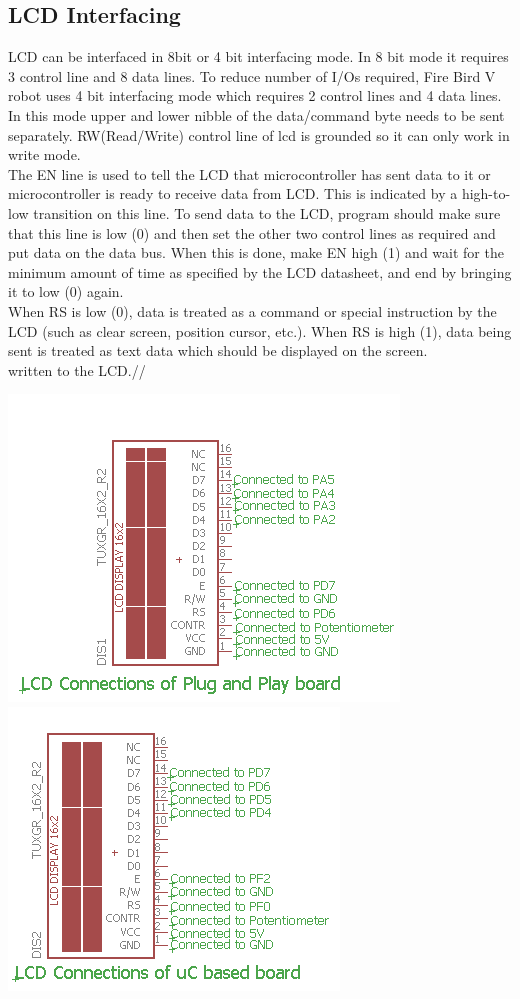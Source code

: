\documentclass[a4paper,10pt,oneside]{article}
\begin{document}
{	\subsection{\huge \textbf{LCD Interfacing}}{
	LCD can be interfaced in 8bit or 4 bit interfacing mode. In 8 bit mode it requires 3 control line
	and 8 data lines. To reduce number of I/Os required, Fire Bird V robot uses 4 bit interfacing
	mode which requires 2 control lines and 4 data lines. In this mode upper and lower nibble of the
	data/command byte needs to be sent separately. RW(Read/Write) control line of lcd is grounded so it can only work in write mode.\\
	The EN line is used to tell the LCD that microcontroller
	has sent data to it or microcontroller is ready to receive data from LCD. This is indicated by a
	high-to-low transition on this line. To send data to the LCD, program should make sure that this
	line is low (0) and then set the other two control lines as required and put data on the data bus.
	When this is done, make EN high (1) and wait for the minimum amount of time as specified by
	the LCD datasheet, and end by bringing it to low (0) again.\\
	When RS is low (0), data is treated as a command or special
	instruction by the LCD (such as clear screen, position cursor, etc.). When RS is high (1), data
	being sent is treated as text data which should be displayed on the screen.\\
	written to the LCD.//}
		\begin{center}
		\includegraphics{lcdPlug}\\
		\includegraphics{lcduC}\\

\end{center}}
\end{document}
